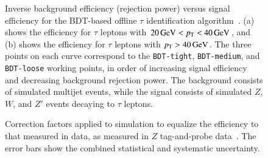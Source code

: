 \begin{figure}[htbp]
	\caption[Inverse background efficiency (rejection power) versus signal efficiency for the BDT-based offline $\tau$ identification algorithm. (a) shows the efficiency for $\tau$ leptons with $\SI{20}{\giga\electronvolt}<\pt<\SI{40}{\giga\electronvolt}$, and (b) shows the efficiency for $\tau$ leptons with $\pt>\SI{40}{\giga\electronvolt}$. The three points on each curve correspond to the \texttt{BDT-tight}, \texttt{BDT-medium}, and \texttt{BDT-loose} working points, in order of increasing signal efficiency and decreasing background rejection power. The background consists of simulated multijet events, while the signal consists of simulated $Z$, $W$, and $Z'$ events decaying to $\tau$ leptons.]{Inverse background efficiency (rejection power) versus signal efficiency for the BDT-based offline $\tau$ identification algorithm~\cite{TheATLASCollaboration:2015be}. (a) shows the efficiency for $\tau$ leptons with $\SI{20}{\giga\electronvolt}<\pt<\SI{40}{\giga\electronvolt}$, and (b) shows the efficiency for $\tau$ leptons with $\pt>\SI{40}{\giga\electronvolt}$. The three points on each curve correspond to the \texttt{BDT-tight}, \texttt{BDT-medium}, and \texttt{BDT-loose} working points, in order of increasing signal efficiency and decreasing background rejection power. The background consists of simulated multijet events, while the signal consists of simulated $Z$, $W$, and $Z'$ events decaying to $\tau$ leptons.}
	\label{fig:reco-tau-efficiency}
\end{figure}

\begin{figure}[htbp]
	\centering
	\caption[Correction factors applied to simulation to equalize the efficiency to that measured in data, as measured in $Z$ tag-and-probe data. The error bars show the combined statistical and systematic uncertainty.]{Correction factors applied to simulation to equalize the efficiency to that measured in data, as measured in $Z$ tag-and-probe data~\cite{TheATLASCollaboration:2015be}. The error bars show the combined statistical and systematic uncertainty.}
	\label{fig:reco-tau-efficiency-scale-factors}
\end{figure}

